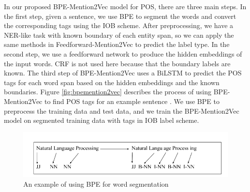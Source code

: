 \documentclass{sfuthesis}
\begin{document}
In our proposed BPE-Mention2Vec model for POS, there are three main steps. In the first step, given a sentence, we use BPE to segment the words and convert the corresponding tags using the IOB scheme. After preprocessing, we have a NER-like task with known boundary of each entity span, so we can apply the same methods in Feedforward-Mention2Vec to predict the label type. In the second step, we use a feedforward network to produce the hidden embeddings of the input words. CRF is not used here because that the boundary labels are known. The third step of BPE-Mention2Vec uses a BiLSTM to predict the POS tags for each word span based on the hidden embeddings and the known boundaries. Figure \ref{fig:bpemention2vec} describes the process of using BPE-Mention2Vec to find POS tags for an example sentence . 
We use BPE to preprocess the training data and test data, and we train the BPE-Mention2Vec model on segmented training data with tags in IOB label scheme. 

\begin{figure}
  \centering
  \includegraphics[scale=0.5]{bpe.png}
 \caption{An example of using BPE for word segmentation}
  \label{fig:bpe}
\end{figure}
\end{document}
